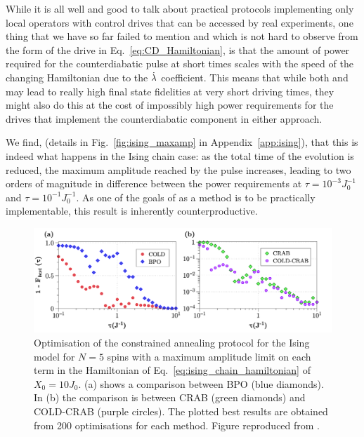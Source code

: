 While it is all well and good to talk about practical protocols implementing only local  operators with control drives that can be accessed by real experiments, one thing that we have so far failed to mention and which is not hard to observe from the form of the  drive in Eq.~\ref{eq:CD_Hamiltonian}, is that the amount of power required for the counterdiabatic pulse at short times scales with the speed of the changing Hamiltonian due to the $\dot{\lambda}$ coefficient. This means that while both  and  may lead to really high final state fidelities at very short driving times, they might also do this at the cost of impossibly high power requirements for the drives that implement the counterdiabatic component in either approach.

We find, (details in Fig.~\ref{fig:ising_maxamp} in Appendix~\ref{app:ising}), that this is indeed what happens in the Ising chain case: as the total time of the evolution is reduced, the maximum amplitude reached by the  pulse increases, leading to two orders of magnitude in difference between the power requirements at $\tau = 10^{-3}J_0^{-1}$ and $\tau = 10^{-1}J_0^{-1}$. As one of the goals of  as a method is to be practically implementable, this result is inherently counterproductive.

\begin{figure}[t]
    \centering
    \includegraphics[width=\linewidth]{images/IsingcConstrained.png} \caption[Applying COLD and COLD-CRAB to the Ising chain for 5 spins with constrained driving amplitudes.]{Optimisation of the constrained annealing protocol for the Ising model for $N=5$ spins with a maximum amplitude limit on each term in the Hamiltonian of Eq.~\eqref{eq:ising_chain_hamiltonian} of $X_0 = 10J_0$. (a) shows a comparison between BPO (blue diamonds). In (b) the comparison is between CRAB (green diamonds) and COLD-CRAB (purple circles). The plotted best results are obtained from 200 optimisations for each method. Figure reproduced from \cite{cepaite_cold_2023}.}\label{fig:ising_constrained}
\end{figure}

